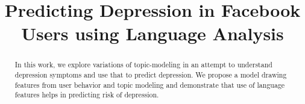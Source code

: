 \documentclass[11pt]{article}
\title{Predicting Depression in Facebook Users using Language Analysis}
\date{}
\begin{document}
\maketitle
\begin{abstract}
In this work, we explore variations of topic-modeling in an attempt to understand depression symptoms and use that to predict depression. We propose a model drawing features from user behavior and topic modeling and demonstrate that use of language features helps in predicting risk of depression.
\end{abstract}


%







%
%
%
%
%
%
\end{document}
